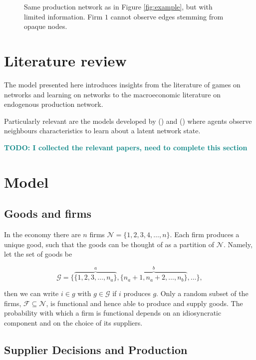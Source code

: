 \documentclass[american, abstract=on]{scrartcl}
\newcommand{\inputTikZ}[2]{%
      \scalebox{#1}{}  
    }
\newcommand{\F}{\mathcal{F}}
\newcommand{\G}{\mathcal{G}}
\newcommand{\N}{\mathcal{N}}
\newcommand{\citein}[1]{\citeauthor{#1} (\citeyear{#1})}
\newcommand\notes[1]{\textcolor{teal}{\textbf{#1}}}
\begin{document}
\begin{figure}[H]
  \centering
  \inputTikZ{0.5}{diagrams/example-limited.tikz} 
  \caption{Same production network as in Figure \ref{fig:example}, but with limited information. Firm $1$ cannot observe edges stemming from opaque nodes.}
  \label{fig:example:unknown}  
\end{figure}

\section{Literature review}

The model presented here introduces insights from the literature of games on networks and learning on networks to the macroeconomic literature on endogenous production network.

Particularly relevant are the models developed by \citein{dasaratha_bayesian_2018} and \citein{dasaratha_learning_2021} where agents observe neighbours characteristics to learn about a latent network state.   

\notes{TODO: I collected the relevant papers, need to complete this section}

\section{Model}

\subsection{Goods and firms}

In the economy there are $n$ firms $\N = \{1, 2, 3, 4, \ldots, n \}$. Each firm produces a unique good, such that the goods can be thought of as a partition of $\N$. Namely, let the set of goods be

\begin{equation}
    \G = \{ \overbrace{\{1, 2, 3, \ldots, n_a\}}^{a},  \overbrace{\{n_a + 1, n_a + 2, \ldots, n_b\}}^{b}, \ldots \},
\end{equation}

then we can write $i \in g$ with $g \in \G$ if $i$ produces $g$. Only a random subset of the firms, $\F \subseteq \N$, is functional and hence able to produce and supply goods. The probability with which a firm is functional depends on an idiosyncratic component and on the choice of its suppliers. 

\subsection{Supplier Decisions and Production}
\end{document}
